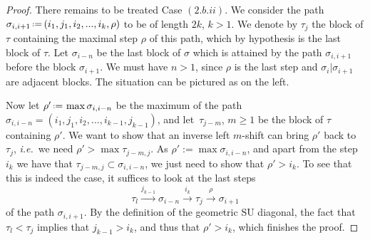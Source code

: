 \documentclass{amsart}
\theoremstyle{definition}
\newcommand{\ssm}{\smallsetminus} %
\newcommand{\eqdef}{\mbox{\,\raisebox{0.2ex}{\scriptsize\ensuremath{\mathrm:}}\ensuremath{=}\,}} %
\newcommand{\ie}{\textit{i.e.}~} %
\newcommand{\SU}{\mathrm{SU}}
\begin{document}
\begin{proof}
There remains to be treated Case $(2.b.ii)$.
We consider the path $\sigma_{i,i+1} \eqdef (i_1,j_1,i_2,...,i_{k},\rho)$ to be of length $2k$, $k>1$. 
We denote by $\tau_j$ the block of $\tau$ containing the maximal step $\rho$ of this path, which by hypothesis is the last block of $\tau$. 
Let $\sigma_{i-n}$ be the last block of $\sigma$ which is attained by the path $\sigma_{i,i+1}$ before the block $\sigma_{i+1}$. 
We must have $n>1$, since $\rho$ is the last step and $\sigma_i|\sigma_{i+1}$ are adjacent blocks.
The situation can be pictured as on the left.
\begin{center}
\end{center}
Now let $\rho' \eqdef \max\sigma_{i,i-n}$ be the maximum of the path $\sigma_{i,i-n}=(i_1,j_1,i_2,...,i_{k-1},j_{k-1})$, and let~$\tau_{j-m}$, $m\geq 1$ be the block of $\tau$ containing $\rho'$.
We want to show that an inverse left $m$-shift can bring $\rho'$ back to $\tau_j$, \ie we need $\rho' > \max \tau_{j-m,j}$.
As $\rho':= \max \sigma_{i,i-n}$, and apart from the step $i_k$ we have that $\tau_{j-m,j}\subset \sigma_{i,i-n}$, we just need to show that $\rho' > i_k$.
To see that this is indeed the case, it suffices to look at the last steps $$\tau_l \overset{j_{k-1}}{\longrightarrow} \sigma_{i-n} \overset{i_{k}}{\longrightarrow} \tau_j \overset{\rho}{\longrightarrow} \sigma_{i+1}$$ of the path $\sigma_{i,i+1}$. 
By the definition of the geometric $\SU$ diagonal, the fact that $\tau_l < \tau_j$ implies that $j_{k-1} > i_k$, and thus that $\rho' > i_k$, which finishes the proof. 
\end{proof}
\end{document}
